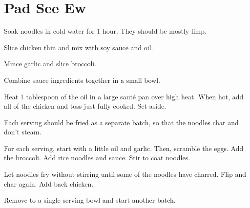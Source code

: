 \section{Pad See Ew}
\begin{recipe}



Soak noodles in cold water for 1 hour. They should be mostly limp. 


Slice chicken thin and mix with soy sauce and oil.


Mince garlic and slice broccoli.


Combine sauce ingredients together in a small bowl.

Heat 1 tablespoon of the oil in a large sauté pan over high heat. When hot, add all 
of the chicken and toss just fully cooked. Set aside.


Each serving should be fried as a separate batch, so that the noodles char and don't steam.

For each serving, start with a little oil and garlic. Then, scramble the eggs. Add the broccoli. 
Add rice noodles and sauce. Stir to coat noodles. 

Let noodles fry without stirring until some of the noodles have charred. Flip and char again. Add back chicken. 

Remove to a single-serving bowl and start another batch.

\end{recipe}
